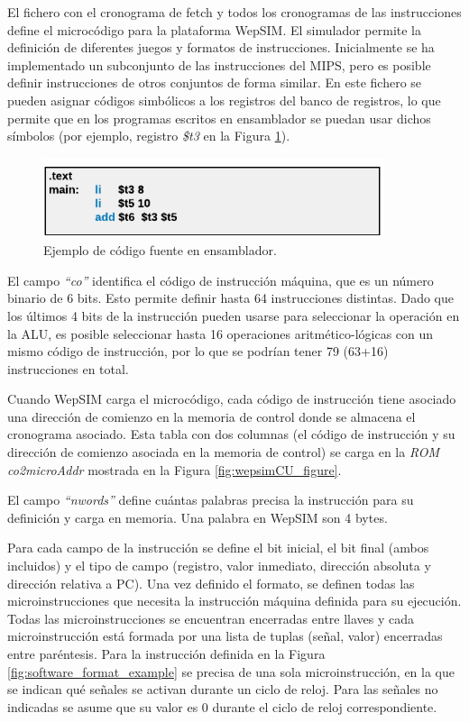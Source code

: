 \vspace{10mm}

El fichero con el cronograma de fetch y todos los cronogramas de las instrucciones define el microcódigo para la plataforma WepSIM. El simulador permite la definición de diferentes juegos y formatos de instrucciones. Inicialmente se ha implementado un subconjunto de las instrucciones del MIPS, pero es posible definir instrucciones de otros conjuntos de forma similar. En este fichero se pueden asignar códigos simbólicos a los registros del banco de registros, lo que permite que en los programas escritos en ensamblador se puedan usar dichos  símbolos (por ejemplo, registro \emph{\$t3} en la Figura \ref{fig:software_assembly_example}).

\begin{figure}[htbp]
 	\centering
 	\includegraphics[width=10cm]{figures/example_assembly}
 	\caption{Ejemplo de código fuente en ensamblador.}
	\label{fig:software_assembly_example}
\end{figure}

El campo \emph{``co''} identifica el código de instrucción máquina, que es un número binario de 6 bits. Esto permite definir hasta 64 instrucciones distintas. Dado que los últimos 4 bits de la instrucción pueden usarse para seleccionar la operación en la ALU, es posible seleccionar hasta 16 operaciones aritmético-lógicas con un mismo código de instrucción, por lo que se podrían tener 79 (63+16) instrucciones en total.

Cuando WepSIM carga el microcódigo, cada código de instrucción tiene asociado una dirección de comienzo en la memoria de control donde se almacena el cronograma asociado. Esta tabla con dos columnas (el código de instrucción y su dirección de comienzo asociada en la memoria de control) se carga en la \emph{ROM co2microAddr} mostrada en la Figura \ref{fig:wepsimCU_figure}.

El campo \emph{``nwords''} define cuántas palabras precisa la instrucción para su definición y carga en memoria. Una palabra en WepSIM son 4 bytes.

Para cada campo de la instrucción se define el bit inicial, el bit final (ambos incluidos) y el tipo de campo (registro, valor inmediato, dirección absoluta y dirección relativa a PC). Una vez definido el formato, se definen todas las microinstrucciones que necesita la instrucción máquina definida para su ejecución. Todas las microinstrucciones se encuentran encerradas entre llaves y cada microinstrucción está formada por una lista de tuplas (señal, valor) encerradas entre paréntesis. Para la instrucción definida en la Figura \ref{fig:software_format_example} se precisa de una sola microinstrucción, en la que se indican qué señales se activan durante un ciclo de reloj. Para las señales no indicadas se asume que su valor es 0 durante el ciclo de reloj correspondiente.

